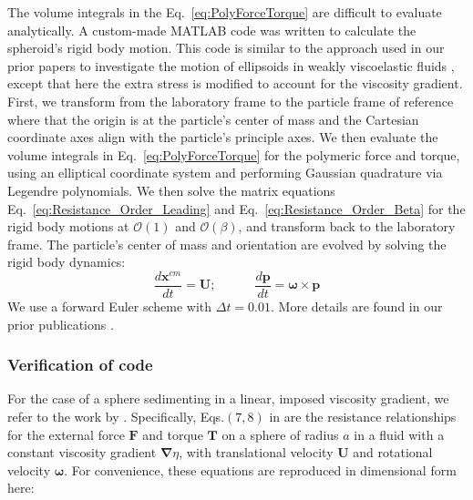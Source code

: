\documentclass{jfm}
\begin{document}
The volume integrals in the Eq.~\eqref{eq:PolyForceTorque} are difficult to evaluate analytically.
A custom-made MATLAB code was written to calculate the spheroid’s rigid body motion.  This code is similar to the approach used in our prior papers to investigate the motion of ellipsoids in weakly viscoelastic fluids \citep{Wang_Narsimhan_POF}, except that here the extra stress is modified to account for the viscosity gradient.  First, we transform from the laboratory frame to the particle frame of reference where that the origin is at the particle’s center of mass and the Cartesian coordinate axes align with the particle’s principle axes.  We then evaluate the volume integrals in Eq.~\eqref{eq:PolyForceTorque}  for the polymeric force and torque, using an elliptical coordinate system and performing Gaussian quadrature via Legendre polynomials. We then solve the matrix equations Eq.~\eqref{eq:Resistance_Order_Leading} and Eq.~\eqref{eq:Resistance_Order_Beta} for the rigid body motions at $\mathcal{O}(1)$ and $\mathcal{O}(\beta)$, and transform back to the laboratory frame.  The particle’s center of mass and orientation are evolved by solving the rigid body dynamics:
\begin{equation}
    \frac{d \boldsymbol{x}^{cm}}{dt}  = \boldsymbol{U}; \qquad \quad              \frac{d \boldsymbol{p}}{dt} = \boldsymbol{\omega} \times \boldsymbol{p}    
\end{equation}
We use a forward Euler scheme with $\Delta t = 0.01$. More details are found in our prior publications \citep{Wang_Narsimhan_POF,anand_narsimhan_2023}.
\subsubsection{Verification of code}

\label{sec:code_verify}
For the case of a sphere sedimenting in a linear, imposed viscosity gradient, we refer to the work by \citep{Datt_Elfring_Viscosity_Gradient}. Specifically, Eqs.$(7,8)$ in \citep{Datt_Elfring_Viscosity_Gradient} are the resistance relationships for the external force $\boldsymbol{F}$ and torque $\boldsymbol{T}$ on a sphere of radius $a$ in a fluid with a constant viscosity gradient $\boldsymbol{\nabla} \eta$, with translational velocity $\boldsymbol{U}$ and rotational velocity $\boldsymbol{\omega}$. For convenience, these equations are reproduced in dimensional form here:
\end{document}
